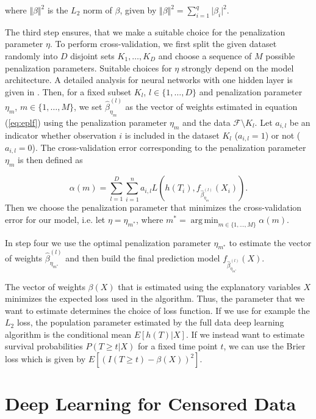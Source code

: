 \documentclass[12pt, a4paper]{scrartcl}
\theoremstyle{definition}
\theoremstyle{plain}
\numberwithin{equation}{section}
\numberwithin{figure}{section}
\numberwithin{table}{section}
\DeclareMathOperator*{\argmin}{arg\,min}
\begin{document}
	where $\Vert \beta \Vert ^2$ is the $L_2$ norm of $\beta$, given by $\Vert \beta \Vert ^2 = \sum_{i=1}^q \vert \beta _i \vert ^2.$
	
	The third step ensures, that we make a suitable choice for the penalization parameter $\eta$.
	To perform cross-validation, we first split the given dataset randomly into $D$ disjoint sets $K_1,\dots, K_D$ and choose a sequence of $M$ possible penalization parameters.
	Suitable choices for $\eta$ strongly depend on the model architecture.
	A detailed analysis for neural networks with one hidden layer is given in \citet*{regpar}. 
	Then, for a fixed subset $K_l$, $l \in \{1,\dots,D\}$ and penalization parameter $\eta_m$, $m \in \{1,\dots,M\}$, we set $\hat{\beta}_{\eta_{m}}^{(l)}$ as the vector of weights estimated in equation (\ref{eq:eplf}) using the penalization parameter $\eta_m$ and the data $\mathcal{F} \setminus K_l$.
	Let $a_{i,l}$ be an indicator whether observation $i$ is included in the dataset $K_l$ ($a_{i,l} = 1$) or not ($a_{i,l}=0$).
	The cross-validation error corresponding to the penalization parameter $\eta_m$ is then defined as
	
	\begin{equation*}
	 \alpha(m) = \sum_{l=1}^D \sum_{i=1}^n a_{i,l} L(h(T_i), f_{\hat{\beta}_{\eta_m}^{(l)}}(X_i)).
 	\end{equation*}
 	Then we choose the penalization parameter that minimizes the cross-validation error for our model, i.e. let $\eta = \eta_{m^*}$, where $m^* = \argmin_{m \in \{1,\dots,M\}} \alpha(m)$.
 	
 	In step four we use the optimal penalization parameter $\eta_{m^*}$ to estimate the vector of weights $\hat{\beta}_{\eta_{m^*}}^{(l)}$ and then build the final prediction model $f_{\hat{\beta}_{\eta_{m^*}}^{(l)}}(X)$.
 	
 	The vector of weights $\beta(X)$ that is estimated using the explanatory variables $X$ minimizes the expected loss used in the algorithm.
 	Thus, the parameter that we want to estimate determines the choice of loss function.
 	If we use for example the $L_2$ loss, the population parameter estimated by the full data deep learning algorithm is the conditional mean $E[h(T) \vert X]$.
 	If we instead want to estimate survival probabilities $P(T\geq t \vert X )$ for a fixed time point $t$, we can use the Brier loss which is given by $E[(I(T\geq t)-\beta(X))^2]$.
 	
	\newpage
	\section{Deep Learning for Censored Data} \label{censored}
	
\end{document}
